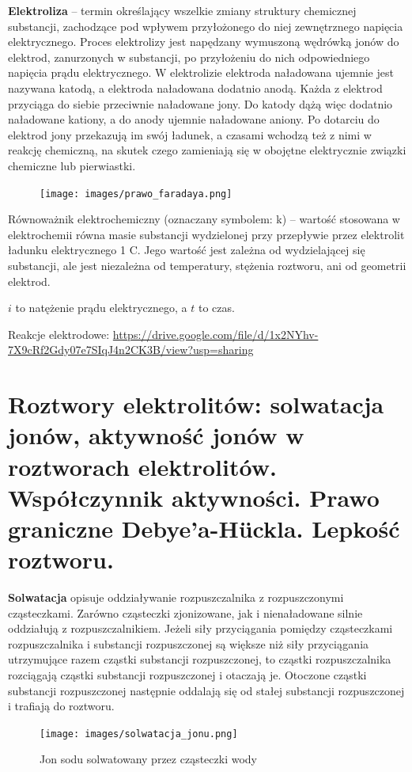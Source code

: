\documentclass{article}
\begin{document}
\textbf{Elektroliza} – termin określający wszelkie zmiany struktury chemicznej substancji, zachodzące pod wpływem przyłożonego do niej zewnętrznego napięcia elektrycznego. Proces elektrolizy jest napędzany wymuszoną wędrówką jonów do elektrod, zanurzonych w substancji, po przyłożeniu do nich odpowiedniego napięcia prądu elektrycznego. W elektrolizie elektroda naładowana ujemnie jest nazywana katodą, a elektroda naładowana dodatnio anodą. Każda z elektrod przyciąga do siebie przeciwnie naładowane jony. Do katody dążą więc dodatnio naładowane kationy, a do anody ujemnie naładowane aniony. Po dotarciu do elektrod jony przekazują im swój ładunek, a czasami wchodzą też z nimi w reakcję chemiczną, na skutek czego zamieniają się w obojętne elektrycznie związki chemiczne lub pierwiastki. 
\begin{figure}[H]
    \centering
    \texttt{[image: images/prawo\_faradaya.png]}
\end{figure}
Równoważnik elektrochemiczny (oznaczany symbolem: k) – wartość stosowana w elektrochemii równa masie substancji wydzielonej przy przepływie przez elektrolit ładunku elektrycznego 1 C. Jego wartość jest zależna od wydzielającej się substancji, ale jest niezależna od temperatury, stężenia roztworu, ani od geometrii elektrod.

$i$ to natężenie prądu elektrycznego, a $t$ to czas.

Reakcje elektrodowe: \url{https://drive.google.com/file/d/1x2NYhv-7X9cRf2Gdy07e7SIqJ4n2CK3B/view?usp=sharing}

\section{Roztwory elektrolitów: solwatacja jonów, aktywność jonów w roztworach elektrolitów. Współczynnik aktywności. Prawo graniczne Debye'a-H{\"u}ckla. Lepkość roztworu.}

\textbf{Solwatacja} opisuje oddziaływanie rozpuszczalnika z rozpuszczonymi cząsteczkami. Zarówno cząsteczki zjonizowane, jak i nienaładowane silnie oddziałują z rozpuszczalnikiem. Jeżeli siły przyciągania pomiędzy cząsteczkami rozpuszczalnika i substancji rozpuszczonej są większe niż siły przyciągania utrzymujące razem cząstki substancji rozpuszczonej, to cząstki rozpuszczalnika rozciągają cząstki substancji rozpuszczonej i otaczają je. Otoczone cząstki substancji rozpuszczonej następnie oddalają się od stałej substancji rozpuszczonej i trafiają do roztworu.

\begin{figure}[H]
    \centering
    \texttt{[image: images/solwatacja\_jonu.png]}
    \caption{Jon sodu solwatowany przez cząsteczki wody}
\end{figure}
\end{document}
